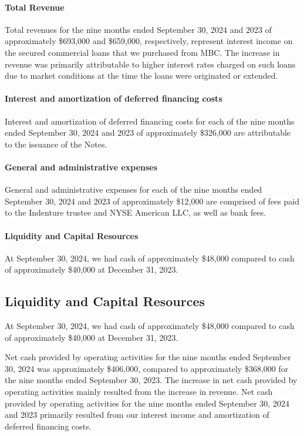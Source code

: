 \documentclass{article}
\begin{document}
\paragraph{Total Revenue}
Total revenues for the nine months ended September 30, 2024 and 2023 of approximately \$693,000 and \$659,000, respectively, represent interest income on the secured commercial loans that we purchased from MBC. The increase in revenue was primarily attributable to higher interest rates charged on such loans due to market conditions at the time the loans were originated or extended.

\paragraph{Interest and amortization of deferred financing costs}
Interest and amortization of deferred financing costs for each of the nine months ended September 30, 2024 and 2023 of approximately \$326,000 are attributable to the issuance of the Notes.

\paragraph{General and administrative expenses}
General and administrative expenses for each of the nine months ended September 30, 2024 and 2023 of approximately \$12,000 are comprised of fees paid to the Indenture trustee and NYSE American LLC, as well as bank fees.

\paragraph{Liquidity and Capital Resources}
At September 30, 2024, we had cash of approximately \$48,000 compared to cash of approximately \$40,000 at December 31, 2023.


\subsection*{Liquidity and Capital Resources}

At September 30, 2024, we had cash of approximately \$48,000 compared to cash of approximately \$40,000 at December 31, 2023.

Net cash provided by operating activities for the nine months ended September 30, 2024 was approximately \$406,000, compared to approximately \$368,000 for the nine months ended September 30, 2023. The increase in net cash provided by operating activities mainly resulted from the increase in revenue. Net cash provided by operating activities for the nine months ended September 30, 2024 and 2023 primarily resulted from our interest income and amortization of deferred financing costs.
\end{document}
